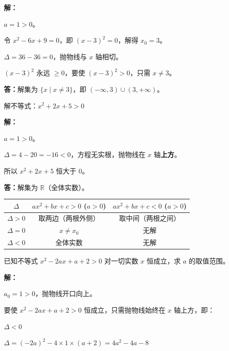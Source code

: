 \documentclass[12pt, a4paper]{ctexart}
\begin{document}
\textbf{解：}

$a = 1 > 0$。

令 $x^2 - 6x + 9 = 0$，即 $(x - 3)^2 = 0$，解得 $x_0 = 3$。

$\Delta = 36 - 36 = 0$，抛物线与 $x$ 轴相切。

$(x-3)^2$ 永远 $\geq 0$，要使 $(x-3)^2 > 0$，只需 $x \neq 3$。

\textbf{答：}解集为 $\{x \mid x \neq 3\}$，即 $(-\infty, 3) \cup (3, +\infty)$。

\begin{examplebox}
解不等式：$x^2 + 2x + 5 > 0$
\end{examplebox}

\textbf{解：}

$a = 1 > 0$。

$\Delta = 4 - 20 = -16 < 0$，方程无实根，抛物线在 $x$ 轴\textbf{上方}。

所以 $x^2 + 2x + 5$ 恒大于 $0$。

\textbf{答：}解集为 $\mathbb{R}$（全体实数）。

\begin{tipbox}[三种情况速记表]
\begin{center}
\begin{tabular}{|c|c|c|}
\hline
$\Delta$ & $ax^2+bx+c > 0$ ($a>0$) & $ax^2+bx+c < 0$ ($a>0$) \\
\hline
$\Delta > 0$ & 取两边（两根外侧） & 取中间（两根之间） \\
\hline
$\Delta = 0$ & $x \neq x_0$ & 无解 \\
\hline
$\Delta < 0$ & 全体实数 & 无解 \\
\hline
\end{tabular}
\end{center}
\end{tipbox}

\begin{examplebox}[【例题6】含参二次不等式]
已知不等式 $x^2 - 2ax + a + 2 > 0$ 对一切实数 $x$ 恒成立，求 $a$ 的取值范围。
\end{examplebox}

\textbf{解：}

$a_0 = 1 > 0$，抛物线开口向上。

要使 $x^2 - 2ax + a + 2 > 0$ 恒成立，只需抛物线始终在 $x$ 轴上方，即：

$\Delta < 0$

$\Delta = (-2a)^2 - 4 \times 1 \times (a + 2) = 4a^2 - 4a - 8$
\end{document}
